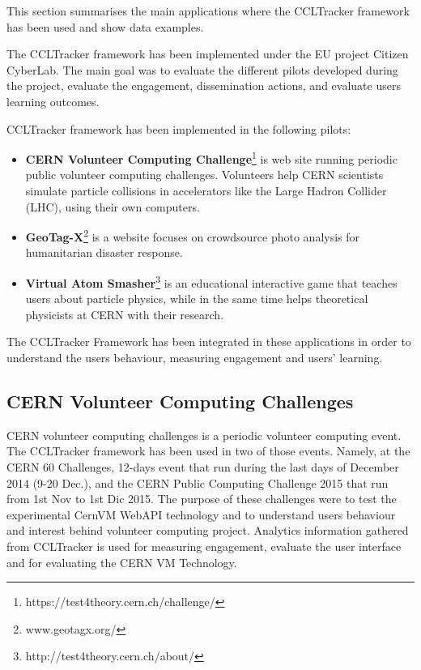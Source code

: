 \documentclass{article}
\begin{document}
This section summarises the main applications where the CCLTracker framework has been used and show data examples. 

The CCLTracker framework has been implemented under the EU project Citizen CyberLab. The main goal was to evaluate the different pilots developed during the project, evaluate the engagement, dissemination actions, and evaluate users learning outcomes.

CCLTracker framework has been implemented in the following pilots:

\begin{itemize}
\item \textbf{CERN Volunteer Computing Challenge}\footnote{https://test4theory.cern.ch/challenge/} is  web site running periodic public volunteer computing challenges. Volunteers help CERN scientists simulate particle collisions in accelerators like the Large Hadron Collider (LHC), using their own computers. 

\item \textbf{GeoTag-X}\footnote{www.geotagx.org/} is a website focuses on crowdsource photo analysis for humanitarian disaster response.

\item \textbf{Virtual Atom Smasher}\footnote{http://test4theory.cern.ch/about/} is an educational interactive game that teaches users about particle physics, while in the same time helps theoretical physicists at CERN with their research.
\end{itemize}


The CCLTracker Framework has been integrated in these applications in order to understand the users behaviour, measuring engagement and users' learning. 


\subsection{CERN Volunteer Computing Challenges}

CERN volunteer computing challenges is a periodic volunteer computing event. The CCLTracker framework has been used in two of those events. Namely, at the CERN 60 Challenges, 12-days event that run during the last days of December 2014 (9-20 Dec.), and the CERN Public Computing Challenge 2015 that run from 1st Nov to 1st Dic 2015. The purpose of these challenges were to test the experimental CernVM WebAPI technology and to understand users behaviour and interest behind volunteer computing project. Analytics information gathered from CCLTracker is used for measuring engagement, evaluate the user interface and for evaluating the CERN VM Technology. 
\end{document}
